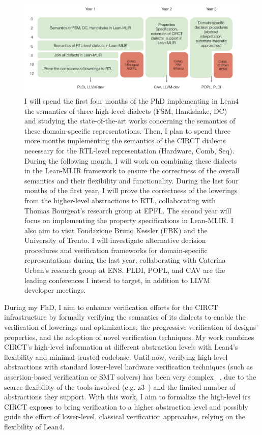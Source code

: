 \documentclass[sigconf,authorversion,nonacm, 11pt]{acmart}
\begin{document}
\begin{figure}[ht]
    \includegraphics[scale=0.8]{logistics.pdf}
    \caption{
        I will spend the first four months of the PhD implementing in Lean4 the semantics of three high-level dialects (FSM, Handshake, DC) and studying the state-of-the-art works concerning the semantics of these domain-specific representations.
        Then, I plan to spend three more months implementing the semantics of the CIRCT dialects necessary for the RTL-level representation (Hardware, Comb, Seq). 
        During the following month, I will work on combining these dialects in the Lean-MLIR framework to ensure the correctness of the overall semantics and their flexibility and functionality. 
        During the last four months of the first year, I will prove the correctness of the lowerings from the higher-level abstractions to RTL, collaborating with Thomas Bourgeat's research group at EPFL. 
        The second year will focus on implementing the property specifications in Lean-MLIR. I also aim to visit Fondazione Bruno Kessler (FBK) and the University of Trento. 
        I will investigate alternative decision procedures and verification frameworks for domain-specific representations during the last year, collaborating with Caterina Urban's research group at ENS. PLDI, POPL, and CAV are the leading conferences I intend to target, in addition to LLVM developer meetings. 
    }
    \label{fig:logistics}
\end{figure}

During my PhD, I aim to enhance verification efforts for the CIRCT infrastructure by formally verifying the semantics of its dialects to enable the verification of lowerings and optimizations, the progressive verification of designs' properties, and the adoption of novel verification techniques. 
My work combines CIRCT's high-level information at different abstraction levels with Lean4's flexibility and minimal trusted codebase. 
Until now, verifying high-level abstractions with standard lower-level hardware verification techniques (such as assertion-based verification or SMT solvers) has been very complex ~\cite{symbiyosys, witharana2022survey}, due to the scarce flexibility of the tools involved (e.g. z3~\cite{de2008z3}) and the limited number of abstractions they support. 
With this work, I aim to formalize the high-level \acp{ir} CIRCT exposes to bring verification to a higher abstraction level and possibly guide the effort of lower-level, classical verification approaches, relying on the flexibility of Lean4.
\end{document}
